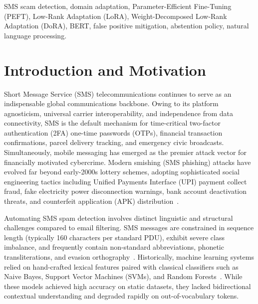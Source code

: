 \documentclass[conference]{IEEEtran}
\begin{document}
\begin{IEEEkeywords}
SMS scam detection, domain adaptation, Parameter-Efficient Fine-Tuning (PEFT), Low-Rank Adaptation (LoRA), Weight-Decomposed Low-Rank Adaptation (DoRA), BERT, false positive mitigation, abstention policy, natural language processing.
\end{IEEEkeywords}

\section{Introduction and Motivation}
\label{sec:intro}

Short Message Service (SMS) telecommunications continues to serve as an indispensable global communications backbone. Owing to its platform agnosticism, universal carrier interoperability, and independence from data connectivity, SMS is the default mechanism for time-critical two-factor authentication (2FA) one-time passwords (OTPs), financial transaction confirmations, parcel delivery tracking, and emergency civic broadcasts. Simultaneously, mobile messaging has emerged as the premier attack vector for financially motivated cybercrime. Modern smishing (SMS phishing) attacks have evolved far beyond early-2000s lottery schemes, adopting sophisticated social engineering tactics including Unified Payments Interface (UPI) payment collect fraud, fake electricity power disconnection warnings, bank account deactivation threats, and counterfeit application (APK) distribution~\cite{almeida2011sms,trai2018tcccpr}.

Automating SMS spam detection involves distinct linguistic and structural challenges compared to email filtering. SMS messages are constrained in sequence length (typically 160 characters per standard PDU), exhibit severe class imbalance, and frequently contain non-standard abbreviations, phonetic transliterations, and evasion orthography~\cite{delany2012sms}. Historically, machine learning systems relied on hand-crafted lexical features paired with classical classifiers such as Naive Bayes, Support Vector Machines (SVMs), and Random Forests~\cite{almeida2011sms}. While these models achieved high accuracy on static datasets, they lacked bidirectional contextual understanding and degraded rapidly on out-of-vocabulary tokens.
\end{document}
